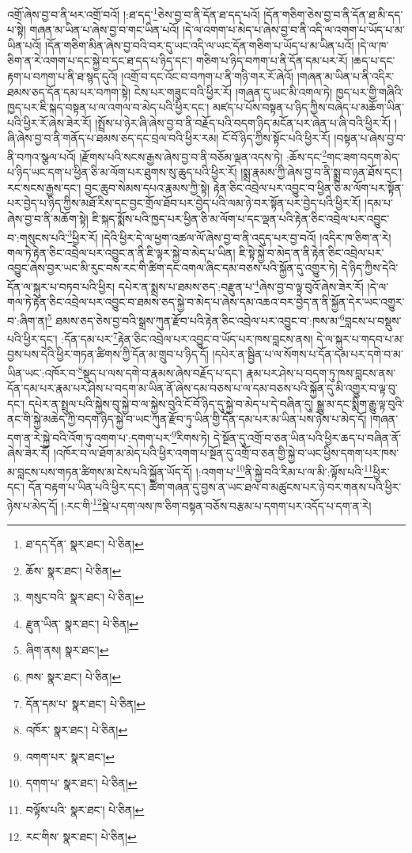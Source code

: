 འགྲོ་ཞེས་བྱ་བ་ནི་ཕར་འགྲོ་བའོ། །:ཐ་དད་\footnote{ཐ་དད་དོན་  སྣར་ཐང་།  པེ་ཅིན། }ཅེས་བྱ་བ་ནི་དོན་ཐ་དད་པའོ། །དོན་གཅིག་ཅེས་བྱ་བ་ནི་དོན་ཐ་མི་དད་པ་སྟེ། གཞན་མ་ཡིན་པ་ཞེས་བྱ་བ་གང་ཡིན་པའོ། །དེ་ལ་འགག་པ་མེད་པ་ཞེས་བྱ་བ་ནི་འདི་ལ་འགག་པ་ཡོད་པ་མ་ཡིན་པའོ། །དོན་གཅིག་མིན་ཞེས་བྱ་བའི་བར་དུ་ཡང་འདི་ལ་ཡང་དོན་གཅིག་པ་ཡོད་པ་མ་ཡིན་པའོ། །དེ་ལ་ཁ་ཅིག་ན་རེ་འགག་པ་དང་སྐྱེ་བ་དང་ཐ་དད་པ་ཉིད་དང་། གཅིག་པ་ཉིད་བཀག་པ་ནི་དོན་དམ་པར་རོ། །ཆད་པ་དང་རྟག་པ་བཀག་པ་ནི་ཐ་སྙད་དུའོ། །འགྲོ་བ་དང་འོང་བ་བཀག་པ་ནི་གཉི་གར་རོ་ཞེའོ། །གཞན་མ་ཡིན་པ་ནི་འདིར་ཐམས་ཅད་དོན་དམ་པར་བཀག་སྟེ། ངེས་པར་གཟུང་བའི་ཕྱིར་རོ། །གཞན་དུ་ཡང་མི་འགལ་ཏེ། ཁྱད་པར་གྱི་གཞིའི་ཁྱད་པར་ཇི་སྐད་བསྟན་པ་ལ་འགལ་བ་མེད་པའི་ཕྱིར་དང་། མཛད་པ་པོས་བསྟན་པ་ཉིད་ཀྱིས་བཞེད་པ་མཆོག་ཡིན་པའི་ཕྱིར་རོ་ཞེས་ཟེར་རོ། །སྤྲོས་པ་ཉེར་ཞི་ཞེས་བྱ་བ་ནི་བརྗོད་པའི་བདག་ཉིད་མངོན་པར་ཞེན་པ་ཞི་བའི་ཕྱིར་རོ། །ཞི་ཞེས་བྱ་བ་ནི་གནོད་པ་ཐམས་ཅད་དང་བྲལ་བའི་ཕྱིར་རམ། ངོ་བོ་ཉིད་ཀྱིས་སྟོང་པའི་ཕྱིར་རོ། །བསྟན་པ་ཞེས་བྱ་བ་ནི་བཀའ་སྩལ་པའོ། །རྫོགས་པའི་སངས་རྒྱས་ཞེས་བྱ་བ་ནི་བཅོམ་ལྡན་འདས་ཏེ། :ཆོས་དང་\footnote{ཆོས་  སྣར་ཐང་།  པེ་ཅིན། }གང་ཟག་བདག་མེད་པ་ཉིད་ཡང་དག་པ་ཕྱིན་ཅི་མ་ལོག་པར་ཐུགས་སུ་ཆུད་པའི་ཕྱིར་རོ། །སྨྲ་རྣམས་ཀྱི་ཞེས་བྱ་བ་ནི་སྨྲ་བ་ཉན་ཐོས་དང་། རང་སངས་རྒྱས་དང་། བྱང་ཆུབ་སེམས་དཔའ་རྣམས་ཀྱི་སྟེ། རྟེན་ཅིང་འབྲེལ་པར་འབྱུང་བ་ཕྱིན་ཅི་མ་ལོག་པར་སྟོན་པར་བྱེད་པ་ཉིད་ཀྱིས་མཐོ་རིས་དང་བྱང་གྲོལ་ཐོབ་པར་བྱེད་པའི་ལམ་ཉེ་བར་སྟོན་པར་བྱེད་པའི་ཕྱིར་རོ། །དམ་པ་ཞེས་བྱ་བ་ནི་མཆོག་སྟེ། ཇི་སྐད་སྨོས་པའི་ཁྱད་པར་ཕྱིན་ཅི་མ་ལོག་པ་དང་ལྡན་པའི་རྟེན་ཅིང་འབྲེལ་པར་འབྱུང་བ་:གསུངས་པའི་\footnote{གསུང་བའི་  སྣར་ཐང་།  པེ་ཅིན། }ཕྱིར་རོ། །དེའི་ཕྱིར་དེ་ལ་ཕྱག་འཚལ་ལོ་ཞེས་བྱ་བ་ནི་འདུད་པར་བྱ་བའོ། །འདིར་ཁ་ཅིག་ན་རེ། གལ་ཏེ་རྟེན་ཅིང་འབྲེལ་པར་འབྱུང་ན་ནི་ཇི་ལྟར་སྐྱེ་བ་མེད་པ་ཡིན། ཇི་སྟེ་སྐྱེ་བ་མེད་ན་ནི་རྟེན་ཅིང་འབྲེལ་པར་འབྱུང་ཞེས་བྱར་ཡང་མི་རུང་བས་རང་གི་ཚིག་དང་འགལ་ཞིང་དམ་བཅས་པའི་སྐྱོན་དུ་འགྱུར་ཏེ། དེ་ཉིད་ཀྱིས་དེའི་དོན་ལ་སྐུར་པ་བཏབ་པའི་ཕྱིར། དཔེར་ན་སྨྲས་པ་ཐམས་ཅད་:བརྫུན་པ་\footnote{རྫུན་ཡིན་  སྣར་ཐང་།  པེ་ཅིན། }ཞེས་བྱ་བ་ལྟ་བུའོ་ཞེས་ཟེར་རོ། །དེ་ལ་གལ་ཏེ་རྟེན་ཅིང་འབྲེལ་པར་འབྱུང་བ་ཐམས་ཅད་སྐྱེ་བ་མེད་པ་ཞེས་དམ་འཆའ་བར་བྱེད་ན་ནི་སྐྱོན་དེར་ཡང་འགྱུར་བ་:ཞིག་ན།\footnote{ཞིག་ནས།  སྣར་ཐང་། } ཐམས་ཅད་ཅེས་བྱ་བའི་སྒྲས་ཀུན་རྫོབ་པའི་རྟེན་ཅིང་འབྲེལ་པར་འབྱུང་བ་:ཁས་མ་\footnote{ཁས་  སྣར་ཐང་།  པེ་ཅིན། }བླངས་པ་བསྡུས་པའི་ཕྱིར་དང་། :དོན་དམ་པར་\footnote{དོན་དམ་པ་  སྣར་ཐང་།  པེ་ཅིན། }རྟེན་ཅིང་འབྲེལ་པར་འབྱུང་བ་ཡོད་པར་ཁས་བླངས་ནས། དེ་ལ་སྐུར་པ་གདབ་པ་མ་བྱས་པས་དེའི་ཕྱིར་གཏན་ཚིགས་ཀྱི་དོན་མ་གྲུབ་པ་ཉིད་དོ། །དཔེར་ན་སྦྱིན་པ་ལ་སོགས་པ་དོན་དམ་པར་དགེ་བ་མ་ཡིན་ཡང་:འཁོར་བ་\footnote{འཁོར་  སྣར་ཐང་།  པེ་ཅིན། }སྡུད་པ་ལས་དགེ་བ་རྣམས་ཞེས་བརྗོད་པ་དང་། རྣམ་པར་ཤེས་པ་བདག་ཏུ་ཁས་བླངས་ནས་དོན་དམ་པར་རྣམ་པར་ཤེས་པ་བདག་མ་ཡིན་ནོ་ཞེས་དམ་བཅས་པ་ལ་དམ་བཅས་པའི་སྐྱོན་དུ་མི་འགྱུར་བ་ལྟ་བུ་དང་། དཔེར་ན་སྤྲུལ་པའི་སྐྱེས་བུ་སྐྱེ་བ་ལ་སྐྱེས་བུའི་ངོ་བོ་ཉིད་དུ་སྐྱེ་བ་མེད་པ་དེ་བཞིན་དུ། སྒྱུ་མ་དང་སྨིག་རྒྱུ་ལྟ་བུའི་ནང་གི་སྐྱེ་མཆེད་ཀྱི་བདག་ཉིད་སྐྱེ་བ་ཡང་ཀུན་རྫོབ་ཏུ་ཡིན་གྱི་དོན་དམ་པར་མ་ཡིན་པས་ཉེས་པ་མེད་དོ། །གཞན་དག་ན་རེ་སྐྱེ་བའི་འོག་ཏུ་འགག་པ་:དགག་པར་\footnote{འགག་པར་  སྣར་ཐང་། }རིགས་ཏེ། དེ་སྔོན་དུ་འགྲོ་བ་ཅན་ཡིན་པའི་ཕྱིར་ཆད་པ་བཞིན་ནོ་ཞེས་ཟེར་རོ། །འཁོར་བ་ལ་ཐོག་མ་མེད་པའི་ཕྱིར་འགག་པ་སྔོན་དུ་འགྲོ་བ་ཅན་གྱི་སྐྱེ་བ་ཡང་ཕྱིས་དགག་པར་ཁས་མ་བླངས་པས་གཏན་ཚིགས་མ་ངེས་པའི་སྐྱོན་ཡོད་དོ། །:འགག་པ་\footnote{དགག་པ་  སྣར་ཐང་།  པེ་ཅིན། }ནི་སྐྱེ་བའི་རིམ་པ་ལ་མི་:ལྟོས་པའི་\footnote{བལྟོས་པའི་  སྣར་ཐང་།  པེ་ཅིན། }ཕྱིར་དང་། དོན་བརྟག་པ་ཡིན་པའི་ཕྱིར་དང་། ཚིག་གཞན་དུ་བྱས་ན་ཡང་ཐལ་བ་མཚུངས་པར་ཉེ་བར་གནས་པའི་ཕྱིར་ཉེས་པ་མེད་དོ། །:རང་གི་\footnote{རང་གིས་  སྣར་ཐང་།  པེ་ཅིན། }སྡེ་པ་དག་ལས་ཁ་ཅིག་བསྟན་བཅོས་བརྩམ་པ་དགག་པར་འདོད་པ་དག་ན་རེ། 